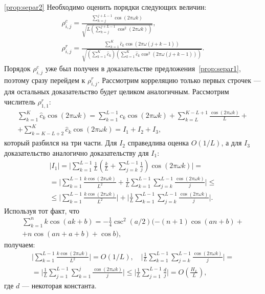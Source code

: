 \documentclass[12pt,a4paper,fleqn,leqno]{article}
\begin{document}
\begin{proof5}{\ref{prop:separ2}}
Необходимо оценить порядки следующих величин:
\begin{gather*}
\rho^c_{i,j} = \frac{\sum_{k=j}^{j + L - 1} \cos(2 \pi \omega k)}{\sqrt{L (\sum_{k=j}^{j + L - 1} \cos^2(2 \pi \omega k))}}, \\ \rho^r_{i,j} = \frac{\sum_{k=1}^K \hat c_k\cos(2 \pi \omega (j + k - 1))}{\sqrt{(\sum_{k=1}^K \hat c_k) (\sum_{k=1}^K \hat c_k\cos^2(2 \pi \omega (j + k - 1)))}}.
\end{gather*}
 Порядок $\rho^c_{i,j}$ уже был получен в доказательстве предложения~\ref{prop:separ1}, поэтому сразу перейдем к $\rho^r_{i,j}$. Рассмотрим корреляцию только первых строчек --- для остальных доказательство будет целиком аналогичным. Рассмотрим числитель $\rho^r_{1,1}$:
\begin{gather*}
\sum_{k=1}^K \hat c_k\cos(2 \pi \omega k) = \sum_{k=1}^{L-1} \hat c_k\cos(2 \pi \omega k) + \sum_{k=L}^{K - L + 1} \frac{\cos(2 \pi \omega k)}{L} +\\+ \sum_{k=K - L + 2}^{K} \hat c_k\cos(2 \pi \omega k) = I_1 + I_2 + I_3,
\end{gather*}
который разбился на три части. Для $I_2$ справедлива оценка $O(1/L)$, а для $I_3$ доказательство аналогично доказательству для $I_1$:
\begin{gather*}
|I_1|=\bigg|\sum_{k=1}^{L-1}\frac{1}{L}\left(\frac{k}{L} + \sum_{j=k}^{L-1} \frac{1}{j} \right) \cos(2 \pi \omega k)\bigg| =\\= \bigg|\sum_{k=1}^{L-1} \frac{k \cos(2 \pi \omega k)}{L^2} +  \frac{1}{L}\sum_{k = 1}^{L-1}\sum_{j = k}^{L-1}\frac{\cos(2 \pi \omega k)}{j}\bigg| \le \\ \le
\bigg|\sum_{k=1}^{L-1} \frac{k \cos(2 \pi \omega k)}{L^2}\bigg| + \bigg|\frac{1}{L}\sum_{k = 1}^{L-1}\sum_{j = k}^{L-1}\frac{\cos(2 \pi \omega k)}{j}\bigg|.
\end{gather*}
Используя тот факт, что
\begin{gather*}
\sum_{k=1}^n k \cos(ak + b) = -\frac{1}{4}\csc^2(a/2)(-(n+1)\cos(an+b) + \\ + n\cos(an + a + b) + \cos b),
\end{gather*}
получаем:
\begin{gather*}
\bigg|\sum_{k=1}^{L-1} \frac{k \cos(2 \pi \omega k)}{L^2}\bigg| = O(1/L), \quad
\bigg|\frac{1}{L}\sum_{k = 1}^{L-1}\sum_{j = k}^{L-1}\frac{\cos(2 \pi \omega k)}{j}\bigg| = \\ =\bigg|\frac{1}{L}\sum_{j = 1}^{L-1}\sum_{k = 1}^{j}\frac{\cos(2 \pi \omega k)}{j}\bigg| \le \bigg|\frac{1}{L}\sum_{j = 1}^{L-1}\frac{d}{j}\bigg| = O \left(\frac{H_L}{L} \right),
\end{gather*}
где $d$ --- некоторая константа. 


\end{proof5}
\end{document}
